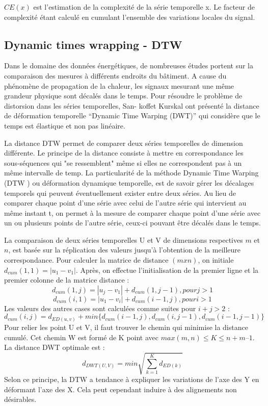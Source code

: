 $CE(x)$ est l’estimation de la complexité de la série temporelle x. Le facteur de complexité étant calculé en cumulant l’ensemble des variations locales du signal.
\subsection{Dynamic times wrapping - DTW}
Dans le domaine des données énergétiques, de nombreuses études portent sur la comparaison des mesures à différents endroits du bâtiment. A cause du phénomène de propagation de la chaleur, les signaux mesurant une même grandeur physique sont décalés dans le temps. Pour résoudre le problème de distorsion dans les séries temporelles, San- koffet Kurskal \cite{kruskal1983} ont présenté la distance de déformation temporelle “Dynamic Time Warping (DWT)” qui considère que le temps est élastique et non pas linéaire.

La distance DTW permet de comparer deux séries temporelles de dimension différente. Le principe de la distance consiste à mettre en correspondance les sous-séquences qui "se ressemblent" même si elles ne correspondent pas à un même intervalle de temp. La particularité de la méthode Dynamic Time Warping (DTW ) ou déformation dynamique temporelle, est de savoir gérer les décalages temporels qui peuvent éventuellement exister entre deux séries. Au lieu de comparer chaque point d’une série avec celui de l’autre série qui intervient au même instant t, on permet à la mesure de comparer chaque point d’une série avec un ou plusieurs points de l’autre série, ceux-ci pouvant être décalés dans le temps. 

La comparaison de deux séries temporelles U et V de dimensions respectives $m$ et $n$, est basée sur la réplication des valeurs jusqu’à l’obtention de la meilleure correspondance. Pour calculer la matrice de distance $(m x n)$, on initiale $d_{cum}(1,1) = | u_1 - v_1 |$. Après, on effectue l'initialisation de la premier ligne et la premier colonne de la matrice distance : 
$$d_{cum}(1, j) = | u_j - v_1 | + d_{cum}(1, j - 1) , pour j > 1$$ 
$$d_{cum}(i, 1) = | u_1 - v_i | + d_{cum}(i - 1, j),  pour  i > 1$$ 
Les valeurs des autres cases sont calculées comme suites pour $i + j > 2$ : 
$$d_{cum}(i, j) = d_{ED(u, v)} + min \{  d_{cum}(i - 1, j), d_{cum}(i, j - 1), d_{cum}(i - 1, j - 1) \} $$
Pour relier les point U et V, il faut trouver le chemin qui minimise la distance cumulé. Cet chemin W est formé de K point avec $max(m,n) \leq K \leq n + m – 1$. La distance DWT optimale est :
$$d_{DWT(U, V)} = min\sqrt{\sum^{K}_{k = 1} {d_{ED(k)}}} $$
Selon ce principe, la DTW a tendance à expliquer les variations de l’axe des Y en déformant l’axe des X. Cela peut cependant induire à des alignements non désirables.
